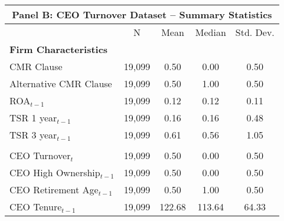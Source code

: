 {
\def\sym#1{\ifmmode^{#1}\else\(^{#1}\)\fi}
\begin{tabular}{l*{1}{cccc}}
\toprule
\multicolumn{5}{c}{\small \centering \textbf{Panel B}: CEO Turnover Dataset -- Summary Statistics} \\ \midrule                    &           N&        Mean&      Median&   Std. Dev.\\
\midrule
\multicolumn{5}{l}{\textbf{Firm Characteristics}} \\ CMR Clause          &      19,099&        0.50&        0.00&        0.50\\
Alternative CMR Clause&      19,099&        0.50&        1.00&        0.50\\
ROA$ _{t-1} $       &      19,099&        0.12&        0.12&        0.11\\
TSR 1 year$ _{t-1}$ &      19,099&        0.16&        0.16&        0.48\\
TSR 3 year$ _{t-1}$ &      19,099&        0.61&        0.56&        1.05\\
\addlinespace \multicolumn{5}{l}{\textbf{CEO Characteristics}} \\ CEO Turnover$ _t $  &      19,099&        0.50&        0.00&        0.50\\
CEO High Ownership$ _{t-1}$&      19,099&        0.50&        0.00&        0.50\\
CEO Retirement Age$ _{t-1}$&      19,099&        0.50&        1.00&        0.50\\
CEO Tenure$ _{t-1}$ &      19,099&      122.68&      113.64&       64.33\\
\bottomrule
\end{tabular}
}
